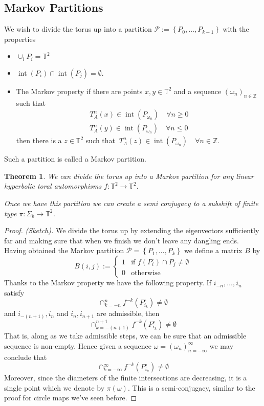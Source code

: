\documentclass[11pt]{article}
\newcommand{\defeq}{:=}
\DeclareMathOperator{\intr}{\mathrm{int}}
\newcommand{\Z}{\mathbb{Z}}
\newcommand{\mdf}[1]{{\color{Green} #1}}
\newtheorem{theorem}{Theorem}[section]
\begin{document}
\subsection{Markov Partitions}
We wish to divide the torus up into a partition $\mathcal{P}\defeq\left\{P_0, \dots, P_{k-1}\right\}$ with the properties
\begin{itemize}
	\item $\cup_i P_i = \mathbb{T}^2$
	\item $\intr(P_i)\cap \intr(P_j)=\emptyset$.
	\item The \mdf{Markov property} if there are points $x,y\in\mathbb{T}^2$ and a sequence $(\omega_n)_{n\in\Z}$ such that
		\begin{align*}
		T_A^n(x)\in\intr(P_{\omega_n})\quad \forall n\geq 0 \\
		T_A^n(y)\in\intr(P_{\omega_n})\quad \forall n\leq 0 
		\end{align*}
		then there is a $z\in\mathbb{T}^2$ such that $\:T_A^n(z)\in\intr(P_{\omega_n})\quad \forall n\in \Z$.
\end{itemize}
Such a partition is called a \mdf{Markov partition}.

\begin{theorem}
We can divide the torus up into a Markov partition for any linear hyperbolic toral automorphisms $f:\mathbb{T}^2\to\mathbb{T}^2$.

Once we have this partition we can create a semi conjugacy to a subshift of finite type $\pi:\Sigma_b\to\mathbb{T}^2$.
\end{theorem}

\begin{proof}
\textit{(Sketch).}
We divide the torus up by extending the eigenvectors sufficiently far and making sure that when we finish we don't leave any dangling ends.
Having obtained the Markov partition $\mathcal{P}=\left\{P_1, \dots, P_k\right\}$ we define a matrix $B$ by
\[
	B(i,j)\defeq
	\begin{cases}
		1 & \text{if }f(P_i^\circ)\cap P_j\neq \emptyset \\
		0 & \text{otherwise}
	\end{cases}
\]
Thanks to the Markov property we have the following property.
If $i_{-n}, \dots, i_n$ satisfy
\[
	\cap_{k=-n}^n f^{-k}(P_{i_k}^\circ)\neq\emptyset
\]
and $i_{-(n+1)}, i_n$ and $i_n, i_{n+1}$ are admissible, then
\[
	\cap_{k=-(n+1)}^{n+1} f^{-k}(P_{i_k}^\circ)\neq\emptyset
\]
That is, along as we take admissible steps, we can be sure that an admissible sequence is non-empty.
Hence given a sequence $\omega=(\omega_n)_{n=-\infty}^\infty$ we may conclude that
\[
	\cap_{k=-\infty}^{\infty} f^{-k}(P_{i_k}^\circ)\neq\emptyset
\]
Moreover, since the diameters of the finite intersections are decreasing, it is a single point which we denote by $\pi(\omega)$.
This is a semi-conjugacy, similar to the proof for circle maps we've seen before.
\end{proof}
\end{document}

